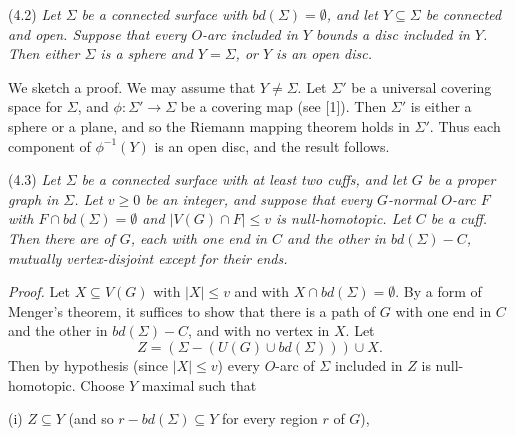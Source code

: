 \stmt
(4.2) \textit{Let $\Sigma$ be a connected surface with $bd(\Sigma) = \emptyset$, and let $Y \subseteq \Sigma$ be connected and open. Suppose that every $O$-arc included in $Y$ bounds a disc included in $Y$. Then either $\Sigma$ is a sphere and $Y = \Sigma$, or $Y$ is an open disc.}

We sketch a proof. We may assume that $Y \ne \Sigma$. Let $\Sigma'$ be a universal covering space for $\Sigma$, and $\phi \colon \Sigma' \to \Sigma$ be a covering map (see [1]). Then $\Sigma'$ is either a sphere or a plane, and so the Riemann mapping theorem holds in $\Sigma'$. Thus each component of $\phi^{-1}(Y)$ is an open disc, and the result follows.

\stmt
(4.3) \textit{Let $\Sigma$ be a connected surface with at least two cuffs, and let $G$ be a proper graph in $\Sigma$. Let $v \ge 0$ be an integer, and suppose that every $G$-normal $O$-arc $F$ with $F \cap bd(\Sigma) = \emptyset$ and $|V(G) \cap F| \le v$ is null-homotopic. Let $C$ be a cuff. Then there are   of $G$, each with one end in $C$ and the other in $bd(\Sigma) - C$, mutually vertex-disjoint except for their ends.}

\textit{Proof.} Let $X \subseteq V(G)$ with $|X| \le v$ and with $X \cap bd(\Sigma) = \emptyset$. By a form of Menger's theorem, it suffices to show that there is a path of $G$ with one end in $C$ and the other in $bd(\Sigma) - C$, and with no vertex in $X$. Let
\begin{equation*}
Z = (\Sigma - (U(G) \cup bd(\Sigma))) \cup X.
\end{equation*}
Then by hypothesis (since $|X| \le v$) every $O$-arc of $\Sigma$ included in $Z$ is null-homotopic. Choose $Y$ maximal such that

\hspace*{12pt}(i) $Z \subseteq Y$ (and so $r - bd(\Sigma) \subseteq Y$ for every region $r$ of $G$),

